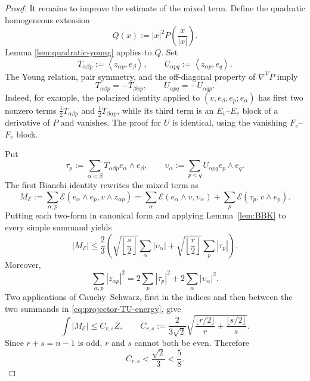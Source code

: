 \documentclass[reqno,11pt]{amsart}
\theoremstyle{definition}
\newcommand{\cE}{\mathcal E}
\newcommand{\inner}[2]{\left\langle #1,#2\right\rangle}
\begin{document}
\begin{proof}
It remains to improve the estimate of the mixed term.  Define the quadratic
homogeneous extension
$$
  Q(x):=|x|^2P\left(\frac{x}{|x|}\right).
$$
Lemma \ref{lem:quadratic-young} applies to $Q$.  Set
$$
 T_{\alpha\beta p}:=\inner{z_{\alpha p}}{e_\beta},
 \qquad
 U_{\alpha pq}:=\inner{z_{\alpha p}}{e_q}.
$$
The Young relation, pair symmetry, and the off-diagonal property of
$\nabla^VP$ imply
\begin{equation*}
  T_{\alpha\beta p}=-T_{\beta\alpha p},
  \qquad
  U_{\alpha pq}=-U_{\alpha qp}.
\end{equation*}
Indeed, for example, the polarized identity applied to
$(v,e_\beta,e_p;e_\alpha)$ has first two nonzero terms
$\frac12T_{\alpha\beta p}$ and
$\frac12T_{\beta\alpha p}$, while its third term is an $E_v$--$E_v$ block
of a derivative of $P$ and vanishes.  The proof for $U$ is identical, using
the vanishing $F_v$--$F_v$ block.

Put
$$
 \tau_p:=\sum_{\alpha<\beta}T_{\alpha\beta p}
 e_\alpha\wedge e_\beta,
 \qquad
 \upsilon_\alpha:=\sum_{p<q}U_{\alpha pq}e_p\wedge e_q.
$$
The first Bianchi identity rewrites the mixed term as
\begin{equation*}
 M_{\cE}:=\sum_{\alpha,p}
 \cE(e_\alpha\wedge e_p,v\wedge z_{\alpha p})
 =\sum_\alpha\cE(e_\alpha\wedge v,\upsilon_\alpha)
  +\sum_p\cE(\tau_p,v\wedge e_p).
\end{equation*}
Putting each two-form in canonical form and applying Lemma~\ref{lem:BBK}
to every simple summand yields
\begin{equation*}
 |M_{\cE}|
 \leq\frac23\left(
 \sqrt{\left\lfloor\frac s2\right\rfloor}
 \sum_\alpha|\upsilon_\alpha|
 +\sqrt{\left\lfloor\frac r2\right\rfloor}
 \sum_p|\tau_p|
 \right).
\end{equation*}
Moreover,
\begin{equation}\label{eq:projector-TU-energy}
 \sum_{\alpha,p}|z_{\alpha p}|^2
 =2\sum_p|\tau_p|^2+2\sum_\alpha|\upsilon_\alpha|^2.
\end{equation}
Two applications of Cauchy--Schwarz, first in the indices and then between
the two summands in \eqref{eq:projector-TU-energy}, give
\begin{equation*}
 \int|M_{\cE}|
 \leq C_{r,s}Z,
 \qquad
 C_{r,s}:=\frac{2}{3\sqrt2}
 \sqrt{
  \frac{\lfloor r/2\rfloor}{r}
  +\frac{\lfloor s/2\rfloor}{s}
 }.
\end{equation*}
Since $r+s=n-1$ is odd, $r$ and $s$ cannot both be even. Therefore
\begin{equation*}
  C_{r,s}<\frac{\sqrt2}{3}<\frac58.
\end{equation*}


\end{proof}
\end{document}

